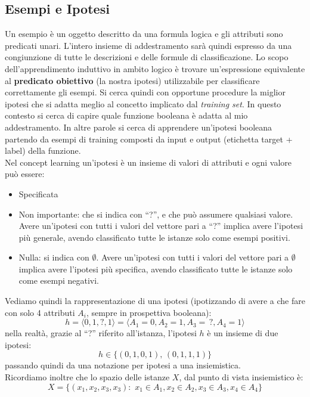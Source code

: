 \subsection{Esempi e Ipotesi}
Un esempio è un oggetto descritto da una formula logica e gli attributi sono predicati unari. L'intero insieme di addestramento sarà quindi espresso da una congiunzione di tutte le descrizioni e delle formule di classificazione. Lo scopo dell'apprendimento induttivo in ambito logico è trovare un'espressione equivalente al \textbf{predicato obiettivo} (la nostra ipotesi) utilizzabile per classificare correttamente gli esempi.
Si cerca quindi con opportune procedure la miglior ipotesi che si adatta
meglio al concetto implicato dal \textit{training set}.
In questo contesto si cerca di capire quale funzione booleana è adatta al mio addestramento. In altre parole si cerca di apprendere un'ipotesi booleana partendo da esempi di training composti da input e output (etichetta target + label) della funzione. \\
Nel concept learning un'ipotesi è un insieme di valori di attributi e ogni valore può essere:
\begin{itemize}
  \item Specificata
  \item Non importante: che si indica con ``?'', e che può assumere qualsiasi
  valore. Avere un'ipotesi con tutti i valori del vettore pari a ``?'' implica
  avere l'ipotesi più generale, avendo classificato tutte le istanze solo come
  esempi positivi. 
  \item Nulla: si indica con $\emptyset$. Avere un'ipotesi con tutti i valori
  del vettore pari a $\emptyset$ implica avere l'ipotesi più specifica, avendo
  classificato tutte le istanze solo come esempi negativi. 
\end{itemize}
\begin{esempio}
  Vediamo quindi la rappresentazione di una ipotesi (ipotizzando di avere a che
  fare con solo 4 attributi $A_i$, sempre in prospettiva booleana):
  \[h=\langle 0, 1, ?, 1\rangle = \langle A_1=0, A_2=1, A_3=\,?, A_4=1\rangle\]
  nella realtà, grazie al ``?'' riferito all'istanza, l'ipotesi $h$ è un insieme
  di due ipotesi: 
  \[h\in\{(0, 1, 0, 1),\,(0, 1, 1, 1)\}\]
  passando quindi da una notazione per ipotesi a una insiemistica.\\
  Ricordiamo inoltre che lo spazio delle istanze $X$, dal punto di vista
  insiemistico è:
  \[X=\{(x_1, x_2, x_3, x_3): \,\, x_1\in A_1, x_2\in A_2, x_3\in A_3, x_4\in A_4\}\]
\end{esempio}
